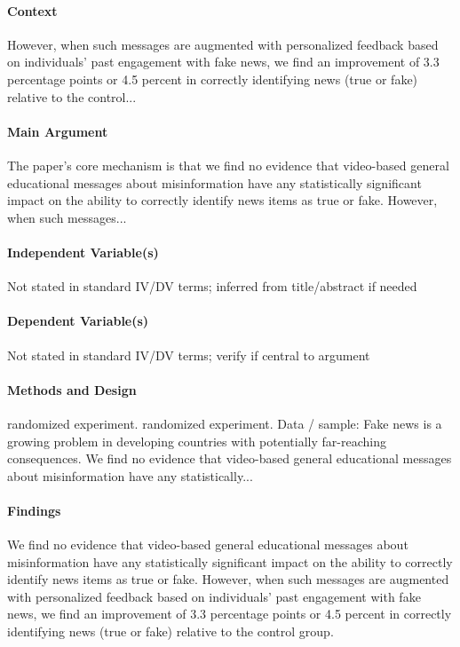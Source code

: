 \documentclass[12pt]{article}
\begin{document}
\paragraph{Context} However, when such messages are augmented with personalized feedback based on individuals' past engagement with fake news, we find an improvement of 3.3 percentage points or 4.5 percent in correctly identifying news (true or fake) relative to the control...

\paragraph{Main Argument} The paper's core mechanism is that we find no evidence that video-based general educational messages about misinformation have any statistically significant impact on the ability to correctly identify news items as true or fake. However, when such messages...

\paragraph{Independent Variable(s)} Not stated in standard IV/DV terms; inferred from title/abstract if needed

\paragraph{Dependent Variable(s)} Not stated in standard IV/DV terms; verify if central to argument

\paragraph{Methods and Design} randomized experiment. randomized experiment. Data / sample: Fake news is a growing problem in developing countries with potentially far-reaching consequences. We find no evidence that video-based general educational messages about misinformation have any statistically...

\paragraph{Findings} We find no evidence that video-based general educational messages about misinformation have any statistically significant impact on the ability to correctly identify news items as true or fake. However, when such messages are augmented with personalized feedback based on individuals' past engagement with fake news, we find an improvement of 3.3 percentage points or 4.5 percent in correctly identifying news (true or fake) relative to the control group.
\end{document}
